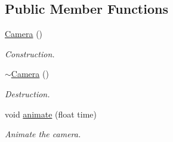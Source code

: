 \subsection*{Public Member Functions}
\begin{DoxyCompactItemize}
\item 
\hyperlink{classCamera_a01f94c3543f56ede7af49dc778f19331}{Camera} ()
\begin{DoxyCompactList}\small\item\em Construction. \end{DoxyCompactList}\item 
\hyperlink{classCamera_ad1897942d0ccf91052386388a497349f}{$\sim$\+Camera} ()
\begin{DoxyCompactList}\small\item\em Destruction. \end{DoxyCompactList}\item 
void \hyperlink{classCamera_aff5389801d0c6e32c2627db0c63b9c24}{animate} (float time)
\begin{DoxyCompactList}\small\item\em Animate the camera. \end{DoxyCompactList}\end{DoxyCompactItemize}
